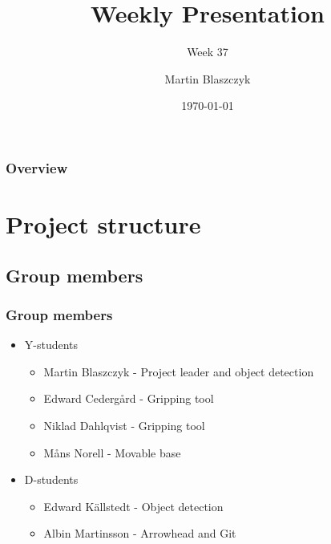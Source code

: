 \documentclass{beamer}
\title{Weekly Presentation}
\subtitle{Week 37}
\author{Martin Blaszczyk}
\institute{Luleå University of Technology}
\date{\today}
\begin{document}
\begin{frame}
    \titlepage
\end{frame}

\begin{frame}
    \frametitle{Overview}
    \tableofcontents
\end{frame}
\section{Project structure}
\begin{frame}
    \subsection{Group members}
    \frametitle{Group members }
    \begin{itemize}
        \item Y-students
        \begin{itemize}
            \item Martin Blaszczyk - Project leader and object detection
            \item Edward Cedergård - Gripping tool
            \item Niklad Dahlqvist - Gripping tool
            \item Måns Norell - Movable base
        \end{itemize}
        \item D-students
        \begin{itemize}
            \item Edward Källstedt - Object detection
            \item Albin Martinsson - Arrowhead and Git
        \end{itemize}  
    \end{itemize}
\end{frame}
\end{document}
